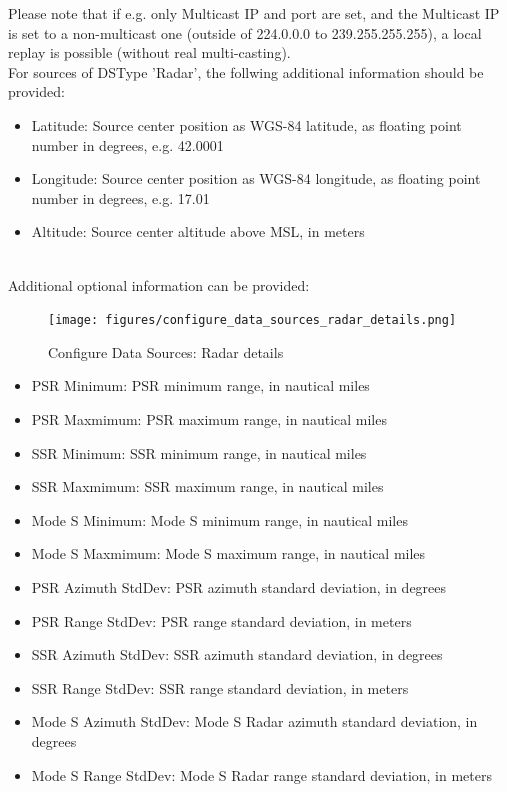 Please note that if e.g. only Multicast IP and port are set, and the Multicast IP is set to a non-multicast one (outside of 224.0.0.0 to 239.255.255.255), a local replay is possible (without real multi-casting). \\

For sources of DSType 'Radar', the follwing additional information should be provided:

\begin{itemize}
\item Latitude: Source center position as WGS-84 latitude, as floating point number in degrees, e.g. 42.0001
\item Longitude: Source center position as WGS-84 longitude, as floating point number in degrees, e.g. 17.01
\item Altitude: Source center altitude above MSL, in meters
\end{itemize}
\ \\

Additional optional information can be provided:

\begin{figure}[H]
  \center
    \texttt{[image: figures/configure\_data\_sources\_radar\_details.png]}
  \caption{Configure Data Sources: Radar details}
\end{figure}

\begin{itemize}
\item PSR Minimum: PSR minimum range, in nautical miles
\item PSR Maxmimum: PSR maximum range, in nautical miles
\item SSR Minimum: SSR minimum range, in nautical miles
\item SSR Maxmimum: SSR maximum range, in nautical miles
\item Mode S Minimum: Mode S minimum range, in nautical miles
\item Mode S Maxmimum: Mode S maximum range, in nautical miles
\item PSR Azimuth StdDev: PSR azimuth standard deviation, in degrees
\item PSR Range StdDev: PSR range standard deviation, in meters
\item SSR Azimuth StdDev: SSR azimuth standard deviation, in degrees
\item SSR Range StdDev: SSR range standard deviation, in meters
\item Mode S Azimuth StdDev: Mode S Radar azimuth standard deviation, in degrees
\item Mode S Range StdDev: Mode S Radar range standard deviation, in meters
\end{itemize}
\ \\

